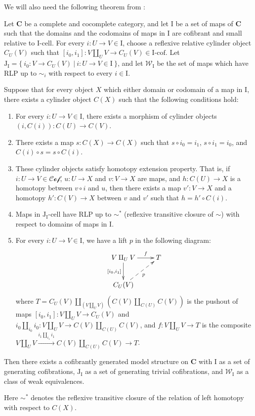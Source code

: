 \documentclass[reqno]{amsart}
\theoremstyle{definition}
\theoremstyle{remark}
\newcommand{\cat}[1]{\mathbf{#1}}
\newcommand{\C}{\cat{C}}
\newcommand{\we}{\mathcal{W}}
\newcommand{\cof}{\mathcal{Cof}}
\newcommand{\I}{\mathrm{I}}
\newcommand{\J}{\mathrm{J}}
\newcommand{\class}[2]{#1\text{-}\mathrm{#2}}
\newcommand{\Icell}[1][\I]{\class{#1}{cell}}
\newcommand{\Icof}[1][\I]{\class{#1}{cof}}
\newcommand{\Jcell}[1][]{\Icell[\J#1]}
\newcommand{\cyli}{i}
\numberwithin{figure}{section}
\begin{document}
We will also need the following theorem from \cite{f-model-structures}:
\begin{thm}
Let $\C$ be a complete and cocomplete category, and let $\I$ be a set of maps of $\C$
such that the domains and the codomains of maps in $\I$ are cofibrant and small relative to $\Icell$.
For every $i : U \to V \in \I$, choose a reflexive relative cylinder object $C_U(V)$
such that $[\cyli_0,\cyli_1] : V \amalg_U V \to C_U(V) \in \Icof$.
Let $\J_\I = \{\ \cyli_0 : V \to C_U(V)\ |\ i : U \to V \in \I \ \}$, and
let $\we_\I$ be the set of maps which have RLP up to $\sim_i$ with respect to every $i \in \I$.

Suppose that for every object $X$ which either domain or codomain of a map in $\I$,
there exists a cylinder object $C(X)$ such that the following conditions hold:
\begin{enumerate}
\item For every $i : U \to V \in \I$, there exists a morphism of cylinder objects $(i,C(i)) : C(U) \to C(V)$.
\item There exists a map $s : C(X) \to C(X)$ such that $s \circ i_0 = i_1$, $s \circ i_1 = i_0$, and $C(i) \circ s = s \circ C(i)$.
\item These cylinder objects satisfy homotopy extension property. That is,
if $i : U \to V \in \cof$, $u : U \to X$ and $v : V \to X$ are maps, and $h : C(U) \to X$ is a homotopy between $v \circ i$ and $u$,
then there exists a map $v' : V \to X$ and a homotopy $h' : C(V) \to X$ between $v$ and $v'$ such that $h = h' \circ C(i)$.
\item Maps in $\Jcell[_\I]$ have RLP up to $\sim^*$ (reflexive transitive closure of $\sim$) with respect to domains of maps in $\I$.
\item For every $i : U \to V \in \I$, we have a lift $p$ in the following diagram:
\[ \xymatrix{ V \amalg_U V \ar[r]^-f \ar[d]_{[\cyli_0,\cyli_1]} & T \\
              C_U(V) \ar@{-->}[ur]_p
            } \]
where $T = C_U(V) \amalg_{(V \amalg_U V)} (C(V) \amalg_{C(U)} C(V))$ is the pushout of maps $[\cyli_0,\cyli_1] : V \amalg_U V \to C_U(V)$
and $\cyli_0 \amalg_{\cyli_0} \cyli_0 : V \amalg_U V \to C(V) \amalg_{C(U)} C(V)$,
and $f : V \amalg_U V \to T$ is the composite $V \amalg_U V \xrightarrow{\cyli_1 \amalg_{\cyli_1} \cyli_1} C(V) \amalg_{C(U)} C(V) \to T$.
\end{enumerate}
Then there exists a cofibrantly generated model structure on $\C$ with $\I$ as a set of generating cofibrations,
$\J_\I$ as a set of generating trivial cofibrations, and $\we_\I$ as a class of weak equivalences.
\end{thm}
Here $\sim^*$ denotes the reflexive transitive closure of the relation of left homotopy with respect to $C(X)$.
\end{document}
